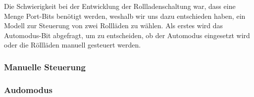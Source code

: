 Die Schwierigkeit bei der Entwicklung der Rollladenschaltung war, dass eine Menge Port-Bits benötigt werden, weshalb wir uns dazu entschieden haben, ein Modell zur Steuerung von zwei Rollläden zu wählen. Als erstes wird das Automodus-Bit abgefragt, um zu entscheiden, ob der Automodus eingesetzt wird oder die Röllläden manuell gesteuert werden. 
\subsubsection{Manuelle Steuerung}
\subsubsection{Audomodus}
